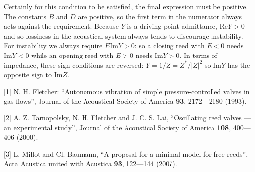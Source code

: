   Certainly for this condition to be satisfied, the final expression must be 
  positive. The constants $B$ and $D$ are positive, so the first term in the 
  numerator always acts against the requirement. Because $Y$ is a driving-point 
  admittance, $\mathrm{Re} Y > 0$ and so lossiness in the acoustical system 
  always tends to discourage instability. For instability we always require 
  $E\mathrm{Im} Y > 0$: so a closing reed with $E<0$ needs $\mathrm{Im} Y<0$ 
  while an opening reed with $E>0$ needs $\mathrm{Im} Y>0$. In terms of 
  impedance, these sign conditions are reversed: $Y=1/Z=Z^*/|Z|^2$ so 
  $\mathrm{Im} Y$ has the opposite sign to $\mathrm{Im} Z$. 

  \sectionreferences{}[1] N. H. Fletcher: “Autonomous vibration of simple 
  pressure-controlled valves in gas flows”, Journal of the Acoustical Society 
  of America \textbf{93}, 2172—2180 (1993). 

  [2] A. Z. Tarnopolsky, N. H. Fletcher and J. C. S. Lai, “Oscillating reed 
  valves — an experimental study”, Journal of the Acoustical Society of America 
  \textbf{108}, 400—406 (2000). 

  [3] L. Millot and Cl. Baumann, “A proposal for a minimal model for free 
  reeds”, Acta Acustica united with Acustica \textbf{93}, 122—144 (2007). 